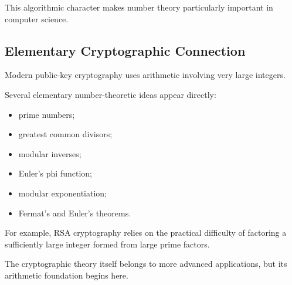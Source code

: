 \begin{centereddiagram}
\end{centereddiagram}

This algorithmic character makes number theory particularly important in
computer science.

\subsection{Elementary Cryptographic Connection}
\label{subsec:elementary-cryptographic-connection}

Modern public-key cryptography uses arithmetic involving very large
integers.

Several elementary number-theoretic ideas appear directly:

\begin{itemize}
    \item prime numbers;
    \item greatest common divisors;
    \item modular inverses;
    \item Euler's phi function;
    \item modular exponentiation;
    \item Fermat's and Euler's theorems.
\end{itemize}

For example, RSA cryptography relies on the practical difficulty of
factoring a sufficiently large integer formed from large prime factors.

The cryptographic theory itself belongs to more advanced applications, but
its arithmetic foundation begins here.

